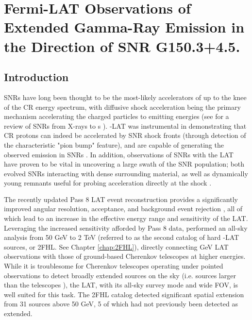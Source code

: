 \chapter{Fermi-LAT Observations of Extended Gamma-Ray Emission in the Direction of SNR G150.3+4.5.}\label{chap:G150}


%
%

\section{Introduction}\label{G150:intro}
SNRs have long been thought to be the most-likely accelerators of \crs{} up to the knee of the CR energy spectrum, with diffusive shock acceleration being the primary mechanism accelerating the charged particles to \gam{} emitting energies (see \cite{Reynolds08} for a review of  SNRs from X-rays to \gam{}s ). \Fermi{}-LAT was instrumental  in demonstrating that CR protons can indeed be accelerated by SNR shock fronts (through detection of the characteristic "pion bump" feature), and are capable of generating the observed \gam{} emission in SNRs \citep{W44pion, Jogler16}. In addition, observations of SNRs with the LAT have proven to be vital in uncovering a large swath of the \gam{} SNR population; both evolved SNRs interacting with dense surrounding material, as well as dynamically young remnants useful for probing acceleration directly at the shock \citep{snrCat}. 

The  recently updated Pass 8 LAT event reconstruction provides a significantly improved angular resolution,  acceptance, and background event rejection \citep[and Chapter \ref{FGST:analysis}]{atwood13b,atwood13}, all of which lead to an increase in the effective energy range and sensitivity of the LAT. Leveraging the increased sensitivity afforded by Pass 8 data, \cite{2FHL} performed an all-sky analysis from 50 GeV to 2 TeV (referred to as the second catalog of hard \Fermi{}-LAT sources, or 2FHL. See Chapter \ref{chap:2FHL}), directly connecting GeV LAT observations  with those of ground-based Cherenkov telescopes at higher energies. While it is troublesome for Cherenkov telescopes operating under pointed observations to detect broadly extended sources on the sky (i.e. sources larger than the telescopes \fov{}), the LAT, with its all-sky survey mode and wide FOV, is well suited for this task. The 2FHL catalog detected significant spatial extension from 31 sources above 50 GeV, 5 of which had not previously been detected as extended.

